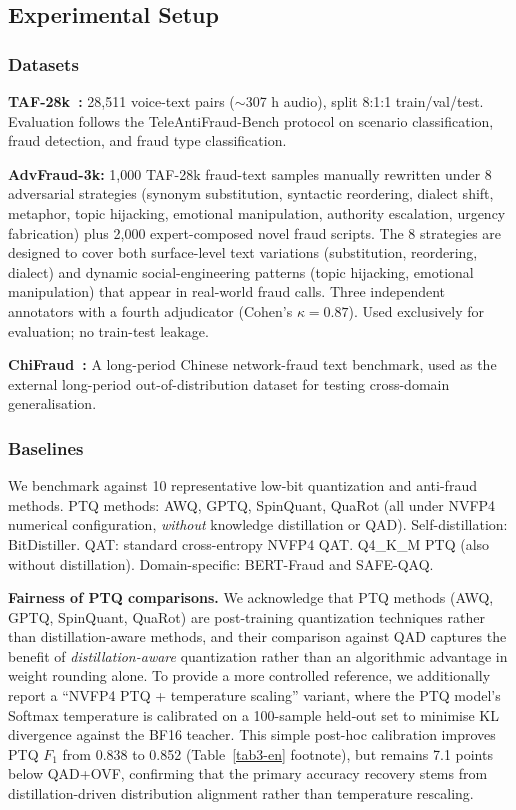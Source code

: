 \documentclass[11pt, a4paper]{article}
\begin{document}
\subsection{Experimental Setup}

\subsubsection{Datasets}

\textbf{TAF-28k~\cite{1}:} 28{,}511 voice-text pairs ($\sim$307 h audio), split 8:1:1 train/val/test. Evaluation follows the TeleAntiFraud-Bench protocol on scenario classification, fraud detection, and fraud type classification.

\textbf{AdvFraud-3k:} 1{,}000 TAF-28k fraud-text samples manually rewritten under 8 adversarial strategies (synonym substitution, syntactic reordering, dialect shift, metaphor, topic hijacking, emotional manipulation, authority escalation, urgency fabrication) plus 2{,}000 expert-composed novel fraud scripts. The 8 strategies are designed to cover both surface-level text variations (substitution, reordering, dialect) and dynamic social-engineering patterns (topic hijacking, emotional manipulation) that appear in real-world fraud calls. Three independent annotators with a fourth adjudicator (Cohen's $\kappa = 0.87$). Used exclusively for evaluation; no train-test leakage.

\textbf{ChiFraud~\cite{chifraud}:} A long-period Chinese network-fraud text benchmark, used as the external long-period out-of-distribution dataset for testing cross-domain generalisation.

\subsubsection{Baselines}

We benchmark against 10 representative low-bit quantization and anti-fraud methods. PTQ methods: AWQ, GPTQ, SpinQuant, QuaRot (all under NVFP4 numerical configuration, \emph{without} knowledge distillation or QAD). Self-distillation: BitDistiller. QAT: standard cross-entropy NVFP4 QAT. Q4\_K\_M PTQ (also without distillation). Domain-specific: BERT-Fraud and SAFE-QAQ.

\medskip
\noindent\textbf{Fairness of PTQ comparisons.} We acknowledge that PTQ methods (AWQ, GPTQ, SpinQuant, QuaRot) are post-training quantization techniques rather than distillation-aware methods, and their comparison against QAD captures the benefit of \emph{distillation-aware} quantization rather than an algorithmic advantage in weight rounding alone. To provide a more controlled reference, we additionally report a ``NVFP4 PTQ + temperature scaling'' variant, where the PTQ model's Softmax temperature is calibrated on a 100-sample held-out set to minimise KL divergence against the BF16 teacher. This simple post-hoc calibration improves PTQ $F_1$ from 0.838 to 0.852 (Table~\ref{tab3-en} footnote), but remains 7.1 points below QAD+OVF, confirming that the primary accuracy recovery stems from distillation-driven distribution alignment rather than temperature rescaling.
\end{document}
